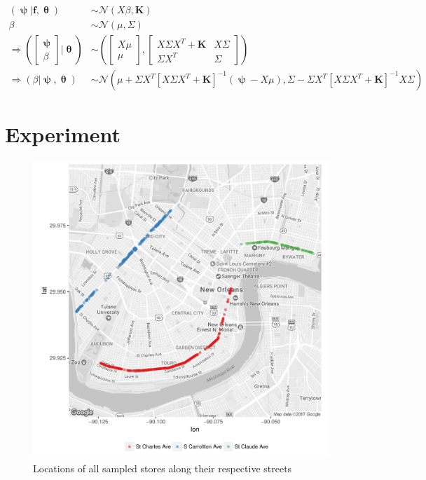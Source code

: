 \documentclass[11pt]{article}
\newcommand{\pN}{\mathcal{N}}
\newcommand{\1}{\mathbf{1}}
\newcommand{\0}{\mathbf{0}}
\newcommand{\f}{\mathbf{f}}
\newcommand{\K}{\mathbf{K}}
\newcommand{\bmpsi}{\bm{\uppsi}}
\begin{document}
\begin{align*}
	(\bmpsi | \f, \bm{\uptheta}) &\sim \pN(X\beta, \K) \\
	\beta &\sim \pN(\mu, \Sigma) \\
	\Rightarrow \left ( \begin{bmatrix}
		\bmpsi \\
		\beta
	\end{bmatrix} | \bm{\uptheta} \right ) &\sim \left( \begin{bmatrix}
		X\mu \\
		\mu
	\end{bmatrix},  \begin{bmatrix}
		X\Sigma X^T + \K & X\Sigma \\
		\Sigma X^T & \Sigma
	\end{bmatrix} \right ) \\
	\Rightarrow (\beta | \bmpsi, \bm{\uptheta}) &\sim \pN \left(\mu + \Sigma X^T \left[ X \Sigma X^T + \K \right]^{-1}(\bmpsi - X\mu), \Sigma - \Sigma X^T \left[ X \Sigma X^T + \K \right]^{-1} X \Sigma \right)
\end{align*}
%
%
%


\section{Experiment}\label{Experiment}

\begin{figure}[htp!]
	\centering
		\includegraphics[scale=0.75]{img/storemap.pdf}
	\caption{Locations of all sampled stores along their respective streets}
	\label{fig:storemap}
\end{figure}
\end{document}
